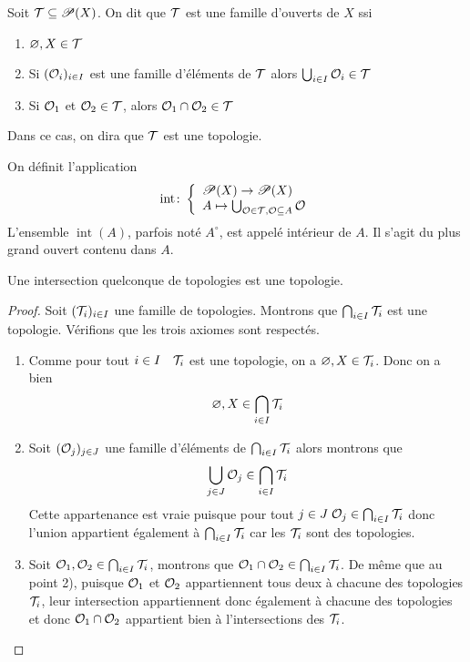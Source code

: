 \begin{definition}
    Soit $\mathcal{T}\subseteq \mathscr{P}(X)$. On dit que $\mathcal{T}$ est une famille d'ouverts de $X$ ssi
    \begin{enumerate}
        \item $\varnothing,X\in \mathcal{T}$
        \item Si $(\mathcal{O}_i)_{i\in I}$ est une famille d'éléments de $\mathcal{T}$ alors $\bigcup_{i\in I}\mathcal{O}_i\in \mathcal{T}$
        \item Si $\mathcal{O}_1$ et $\mathcal{O}_2\in \mathcal{T}$, alors $\mathcal{O}_1\cap \mathcal{O}_2\in \mathcal{T}$ 
    \end{enumerate}
    Dans ce cas, on dira que $\mathcal{T}$ est une topologie.
\end{definition}
\begin{definition}
On définit l'application $$\operatorname{int}\colon \left\{\begin{array}{l}\mathscr{P}(X)\to \mathscr{P}(X) \\A\mapsto\bigcup_{\mathcal{O}\in\mathcal{T}, \mathcal{O}\subseteq A}\mathcal{O}\end{array}\right.$$ L'ensemble $\operatorname{int}(A)$, parfois noté $A^\circ$, est appelé intérieur de $A$. Il s'agit du plus grand ouvert contenu dans $A$.
\end{definition}
\begin{proposition}
    Une intersection quelconque de topologies est une topologie.
\end{proposition}
\begin{proof}
Soit $(\mathcal{T}_i)_{i\in I}$ une famille de topologies. Montrons que $\bigcap_{i\in I}\mathcal{T}_i$ est une topologie. Vérifions que les trois axiomes sont respectés.
\begin{enumerate}
    \item Comme pour tout $i\in I\quad \mathcal{T}_i$ est une topologie, on a $\varnothing, X\in \mathcal{T}_i$. Donc on a bien \[\varnothing,X\in \bigcap_{i\in I}\mathcal{T}_i\]
    \item Soit $(\mathcal{O}_j)_{j\in J}$ une famille d'éléments de $\bigcap_{i\in I}\mathcal{T}_i$ alors montrons que
    \[\bigcup_{j\in J}\mathcal{O}_j\in \bigcap_{i\in I}\mathcal{T}_i
    \]
    Cette appartenance est vraie puisque pour tout $j\in J \; \mathcal{O}_j\in \bigcap_{i\in I}\mathcal{T}_i$ donc l'union appartient également à $\bigcap_{i\in I}\mathcal{T}_i$ car les $\mathcal{T}_i$ sont des topologies.
    \item Soit $\mathcal{O}_1,\mathcal{O}_2\in \bigcap_{i\in I}\mathcal{T}_i$, montrons que $\mathcal{O}_1\cap\mathcal{O}_2\in \bigcap_{i\in I}\mathcal{T}_i$. De même que au point 2), puisque $\mathcal{O}_1$ et $\mathcal{O}_2$ appartiennent tous deux à chacune des topologies $\mathcal{T}_i$, leur intersection appartiennent donc également à chacune des topologies et donc $\mathcal{O}_1\cap\mathcal{O}_2$ appartient bien à l'intersections des $\mathcal{T}_i$.
\end{enumerate}
\end{proof}
